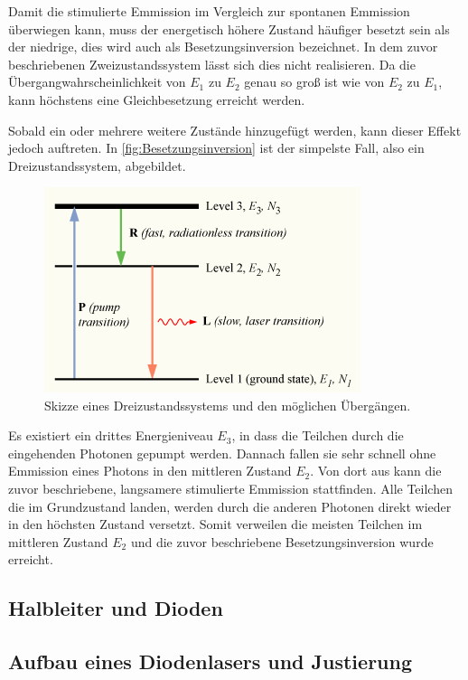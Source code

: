 Damit die stimulierte Emmission im Vergleich zur spontanen Emmission überwiegen kann, muss der energetisch
höhere Zustand häufiger besetzt sein als der niedrige, dies wird auch als Besetzungsinversion bezeichnet.
In dem zuvor beschriebenen Zweizustandssystem lässt sich dies nicht realisieren. Da die Übergangwahrscheinlichkeit
von $E_1$ zu $E_2$ genau so groß ist wie von $E_2$ zu $E_1$, kann höchstens
eine Gleichbesetzung erreicht werden.

Sobald ein oder mehrere weitere Zustände hinzugefügt werden, kann dieser Effekt jedoch auftreten.
In \autoref{fig:Besetzungsinversion} ist der simpelste Fall, also ein Dreizustandssystem, abgebildet.
\begin{figure}[H]
    \centering
    \includegraphics[height=6cm]{content/pics/besetzungsinversion.png}
    \caption{Skizze eines Dreizustandssystems und den möglichen Übergängen. \cite{Besetzungsinversion}}
    \label{fig:Besetzungsinversion}
\end{figure}
Es existiert ein drittes Energieniveau $E_3$, in dass die Teilchen durch die eingehenden Photonen gepumpt werden.
Dannach fallen sie sehr schnell ohne Emmission eines Photons in den mittleren Zustand $E_2$. Von dort aus kann
die zuvor beschriebene, langsamere stimulierte Emmission stattfinden. Alle Teilchen die im Grundzustand landen,
werden durch die anderen Photonen direkt wieder in den höchsten Zustand versetzt. Somit verweilen die meisten
Teilchen im mittleren Zustand $E_2$ und die zuvor beschriebene Besetzungsinversion wurde erreicht.

\subsection{Halbleiter und Dioden}

\subsection{Aufbau eines Diodenlasers und Justierung}

